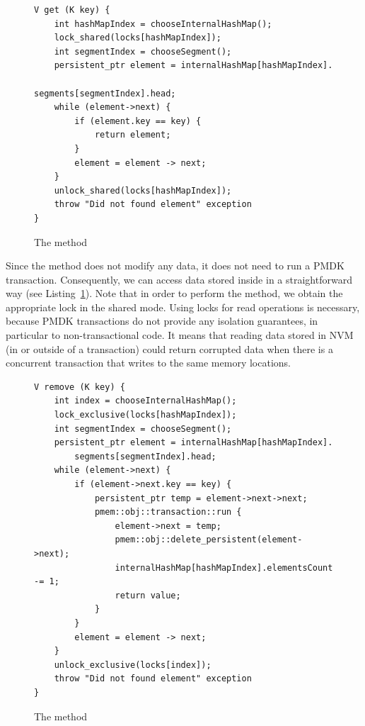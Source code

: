 \begin{figure}[ht]
\renewcommand{\figurename}{Listing}
\begin{lstlisting}
V get (K key) {
    int hashMapIndex = chooseInternalHashMap();
    lock_shared(locks[hashMapIndex]);
    int segmentIndex = chooseSegment();
    persistent_ptr element = internalHashMap[hashMapIndex].
                                    segments[segmentIndex].head;
    while (element->next) {
        if (element.key == key) {
            return element;
        }
        element = element -> next;
    }
    unlock_shared(locks[hashMapIndex]);
    throw "Did not found element" exception
}
\end{lstlisting}
\caption{The \getMethod method}
\label{getMethod}
\end{figure}

        Since the \getMethod method does not modify any data, it does not need to run a PMDK transaction. Consequently, we can access data stored inside \internalHashMap in a straightforward way (see Listing~\ref{getMethod}). Note that in order to perform the \getMethod method, we obtain the appropriate lock in the shared mode. Using locks for read operations is necessary, because PMDK transactions do not provide any isolation guarantees, in particular to non-transactional code. It means that reading data stored in NVM (in or outside of a transaction) could return corrupted data when there is a concurrent transaction that writes to the same memory locations. 

        
\begin{figure}[ht]
\renewcommand{\figurename}{Listing}
\begin{lstlisting}
V remove (K key) {
    int index = chooseInternalHashMap();
    lock_exclusive(locks[hashMapIndex]);
    int segmentIndex = chooseSegment();
    persistent_ptr element = internalHashMap[hashMapIndex].
        segments[segmentIndex].head;
    while (element->next) {
        if (element->next.key == key) {
            persistent_ptr temp = element->next->next;
            pmem::obj::transaction::run {
                element->next = temp;
                pmem::obj::delete_persistent(element->next);
                internalHashMap[hashMapIndex].elementsCount -= 1;
                return value;
            }
        }
        element = element -> next;
    } 
    unlock_exclusive(locks[index]);
    throw "Did not found element" exception
}
\end{lstlisting}
\caption{The \removeMethod method}
\label{removeMethod}
\end{figure}

